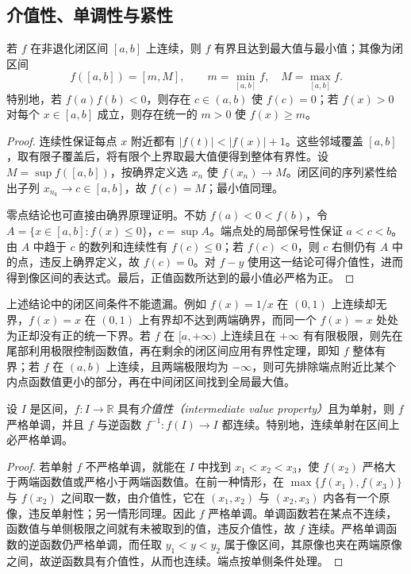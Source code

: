 \subsection{介值性、单调性与紧性}

\begin{theorem}
\label{thm:pei-compact-continuity}
若 $f$ 在非退化闭区间 $[a,b]$ 上连续，则 $f$ 有界且达到最大值与最小值；其像为闭区间
\[
f([a,b])=[m,M],\qquad m=\min_{[a,b]}f,\quad M=\max_{[a,b]}f.
\]
特别地，若 $f(a)f(b)<0$，则存在 $c\in(a,b)$ 使 $f(c)=0$；若 $f(x)>0$ 对每个 $x\in[a,b]$ 成立，则存在统一的 $m>0$ 使 $f(x)\ge m$。
\end{theorem}

\begin{proof}
连续性保证每点 $x$ 附近都有 $|f(t)|<|f(x)|+1$。这些邻域覆盖 $[a,b]$，取有限子覆盖后，将有限个上界取最大值便得到整体有界性。设 $M=\sup f([a,b])$，按确界定义选 $x_n$ 使 $f(x_n)\to M$。闭区间的序列紧性给出子列 $x_{n_k}\to c\in[a,b]$，故 $f(c)=M$；最小值同理。

零点结论也可直接由确界原理证明。不妨 $f(a)<0<f(b)$，令 $A=\{x\in[a,b]:f(x)\le0\}$，$c=\sup A$。端点处的局部保号性保证 $a<c<b$。由 $A$ 中趋于 $c$ 的数列和连续性有 $f(c)\le0$；若 $f(c)<0$，则 $c$ 右侧仍有 $A$ 中的点，违反上确界定义，故 $f(c)=0$。对 $f-y$ 使用这一结论可得介值性，进而得到像区间的表达式。最后，正值函数所达到的最小值必严格为正。
\end{proof}

上述结论中的闭区间条件不能遗漏。例如 $f(x)=1/x$ 在 $(0,1)$ 上连续却无界，$f(x)=x$ 在 $(0,1)$ 上有界却不达到两端确界，而同一个 $f(x)=x$ 处处为正却没有正的统一下界。若 $f$ 在 $[a,+\infty)$ 上连续且在 $+\infty$ 有有限极限，则先在尾部利用极限控制函数值，再在剩余的闭区间应用有界性定理，即知 $f$ 整体有界；若 $f$ 在 $(a,b)$ 上连续，且两端极限均为 $-\infty$，则可先排除端点附近比某个内点函数值更小的部分，再在中间闭区间找到全局最大值。

\begin{proposition}
\label{prop:pei-injective-ivt}
设 $I$ 是区间，$f:I\to\mathbb R$ 具有\emph{介值性（intermediate value property）}且为单射，则 $f$ 严格单调，并且 $f$ 与逆函数 $f^{-1}:f(I)\to I$ 都连续。特别地，连续单射在区间上必严格单调。
\end{proposition}

\begin{proof}
若单射 $f$ 不严格单调，就能在 $I$ 中找到 $x_1<x_2<x_3$，使 $f(x_2)$ 严格大于两端函数值或严格小于两端函数值。在前一种情形，在 $\max\{f(x_1),f(x_3)\}$ 与 $f(x_2)$ 之间取一数，由介值性，它在 $(x_1,x_2)$ 与 $(x_2,x_3)$ 内各有一个原像，违反单射性；另一情形同理。因此 $f$ 严格单调。单调函数若在某点不连续，函数值与单侧极限之间就有未被取到的值，违反介值性，故 $f$ 连续。严格单调函数的逆函数仍严格单调，而任取 $y_1<y<y_2$ 属于像区间，其原像也夹在两端原像之间，故逆函数具有介值性，从而也连续。端点按单侧条件处理。
\end{proof}

